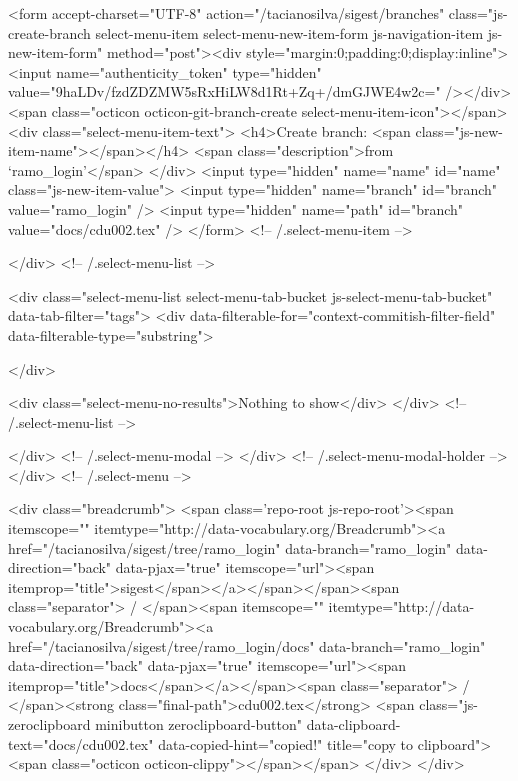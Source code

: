           <form accept-charset="UTF-8" action="/tacianosilva/sigest/branches" class="js-create-branch select-menu-item select-menu-new-item-form js-navigation-item js-new-item-form" method="post"><div style="margin:0;padding:0;display:inline"><input name="authenticity_token" type="hidden" value="9haLDv/fzdZDZMW5sRxHiLW8d1Rt+Zq+/dmGJWE4w2c=" /></div>
            <span class="octicon octicon-git-branch-create select-menu-item-icon"></span>
            <div class="select-menu-item-text">
              <h4>Create branch: <span class="js-new-item-name"></span></h4>
              <span class="description">from ‘ramo_login’</span>
            </div>
            <input type="hidden" name="name" id="name" class="js-new-item-value">
            <input type="hidden" name="branch" id="branch" value="ramo_login" />
            <input type="hidden" name="path" id="branch" value="docs/cdu002.tex" />
          </form> <!-- /.select-menu-item -->

      </div> <!-- /.select-menu-list -->

      <div class="select-menu-list select-menu-tab-bucket js-select-menu-tab-bucket" data-tab-filter="tags">
        <div data-filterable-for="context-commitish-filter-field" data-filterable-type="substring">


        </div>

        <div class="select-menu-no-results">Nothing to show</div>
      </div> <!-- /.select-menu-list -->

    </div> <!-- /.select-menu-modal -->
  </div> <!-- /.select-menu-modal-holder -->
</div> <!-- /.select-menu -->

  <div class="breadcrumb">
    <span class='repo-root js-repo-root'><span itemscope="" itemtype="http://data-vocabulary.org/Breadcrumb"><a href="/tacianosilva/sigest/tree/ramo_login" data-branch="ramo_login" data-direction="back" data-pjax="true" itemscope="url"><span itemprop="title">sigest</span></a></span></span><span class="separator"> / </span><span itemscope="" itemtype="http://data-vocabulary.org/Breadcrumb"><a href="/tacianosilva/sigest/tree/ramo_login/docs" data-branch="ramo_login" data-direction="back" data-pjax="true" itemscope="url"><span itemprop="title">docs</span></a></span><span class="separator"> / </span><strong class="final-path">cdu002.tex</strong> <span class="js-zeroclipboard minibutton zeroclipboard-button" data-clipboard-text="docs/cdu002.tex" data-copied-hint="copied!" title="copy to clipboard"><span class="octicon octicon-clippy"></span></span>
  </div>
</div>


